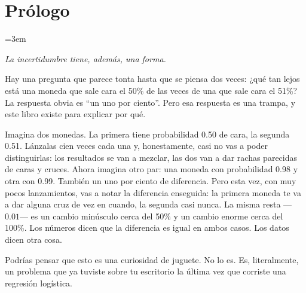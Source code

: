 %
%

\chapter*{Prólogo}

\begingroup
\setlength{\parindent}{0pt}
\setlength{\parskip}{7pt}
\emergencystretch=3em
\sloppy

\begin{flushright}
	\itshape \guillemotleft La incertidumbre tiene, además, una forma.\guillemotright
\end{flushright}

\vspace{1em}
Hay una pregunta que parece tonta hasta que se piensa dos veces: ¿qué tan lejos está una moneda que sale cara el 50\% de las veces de una que sale cara el 51\%? La respuesta obvia es ``un uno por ciento''. Pero esa respuesta es una trampa, y este libro existe para explicar por qué.

Imagina dos monedas. La primera tiene probabilidad 0.50 de cara, la segunda 0.51. Lánzalas cien veces cada una y, honestamente, casi no vas a poder distinguirlas: los resultados se van a mezclar, las dos van a dar rachas parecidas de caras y cruces. Ahora imagina otro par: una moneda con probabilidad 0.98 y otra con 0.99. También un uno por ciento de diferencia. Pero esta vez, con muy pocos lanzamientos, vas a notar la diferencia enseguida: la primera moneda te va a dar alguna cruz de vez en cuando, la segunda casi nunca. La misma resta ---$0.01$--- es un cambio minúsculo cerca del 50\% y un cambio enorme cerca del 100\%. Los números dicen que la diferencia es igual en ambos casos. Los datos dicen otra cosa.

Podrías pensar que esto es una curiosidad de juguete. No lo es. Es, literalmente, un problema que ya tuviste sobre tu escritorio la última vez que corriste una regresión logística.

